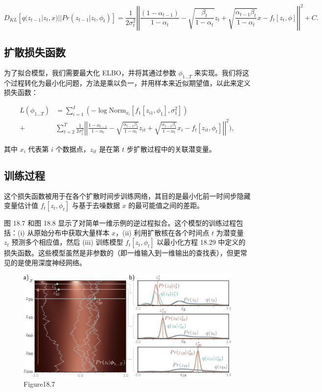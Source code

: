 \[
D_{KL} \left[ q(z_{t-1}|z_t, x)||Pr(z_{t-1}|z_t, \phi_t) \right] = \frac{1}{2\sigma^2_t} \left| \left| \frac{(1 - \alpha_{t-1})}{1 - \alpha_t} - \sqrt{\frac{\beta_t}{1 - \alpha_t}} z_t + \sqrt{\frac{\alpha_{t-1}\beta_t}{1 - \alpha_t}} x - f_t[z_t, \phi] \right| \right|^2 + C. \tag{18.28}
\]

\subsection{扩散损失函数}
为了拟合模型，我们需要最大化 ELBO，并将其通过参数 \(\phi_{1...T}\) 来实现。我们将这个过程转化为最小化问题，方法是乘以负一，并用样本来近似期望值，以此来定义损失函数：


\begin{align}
L(\phi_{1...T}) &= \sum_{i=1}^I \left( -\log \text{Norm}_{x_i} [f_1[z_{i1}, \phi_1], \sigma^2_{1}] \right) \\ 
+ &\sum_{t=2}^T \frac{1}{2\sigma^2_t} \left| \left| \frac{1 - \alpha_{t-1}}{1 - \alpha_t} - \sqrt{\frac{\alpha_{t-1}\beta_t}{1 - \alpha_t}} z_{it} + \sqrt{\frac{\alpha_{t-1}\beta_t}{1 - \alpha_t}} x_i - f_t[z_{it}, \phi_t] \right| \right|^2),
\end{align} 



其中 \(x_i\) 代表第 \(i\) 个数据点，\(z_{it}\) 是在第 \(t\) 步扩散过程中的关联潜变量。

\subsection{训练过程}
这个损失函数被用于在各个扩散时间步训练网络，其目的是最小化前一时间步隐藏变量估计值 \(f_t[z_t, \phi_t]\) 与基于去噪数据 \(x\) 的最可能值之间的差距。

图 18.7 和图 18.8 显示了对简单一维示例的逆过程拟合。这个模型的训练过程包括：(i) 从原始分布中获取大量样本 \(x\)，(ii) 利用扩散核在各个时间点 \(t\) 为潜变量 \(z_t\) 预测多个相应值，然后 (iii) 训练模型 \(f_t[z_t, \phi_t]\) 以最小化方程 18.29 中定义的损失函数。这些模型虽然是非参数的（即一维输入到一维输出的查找表），但更常见的是使用深度神经网络。

\begin{figure}[h!]
\centering
\includegraphics[width=0.7\linewidth]{png/chapter18/DiffusionPredict.png}
\caption{Figure18.7}
\end{figure}

